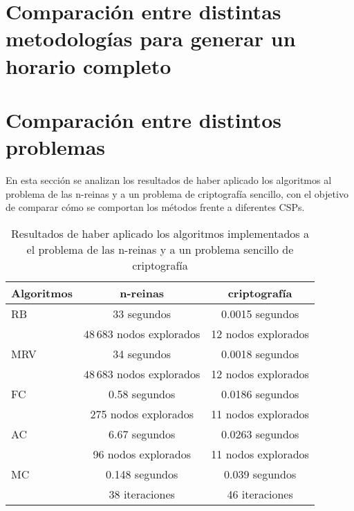 \section{Comparaci\'on entre distintas metodolog\'ias para generar un horario completo}

\section{Comparaci\'on entre distintos problemas}

En esta secci\'on se analizan los resultados de haber aplicado los algoritmos al problema de las n-reinas y a un problema de criptograf\'ia sencillo, con el objetivo de comparar c\'omo se comportan los m\'etodos frente a diferentes CSPs.

\begin{table}[h]
	\caption{Resultados de haber aplicado los algoritmos implementados a el problema de las n-reinas y a un problema sencillo de criptograf\'ia}
	\begin{center}
		\label{2problemas}
		\begin{tabular}{|l|c|c||}
			\hline \hline
			Algoritmos & n-reinas & criptograf\'ia \\ \hline
			RB & 33 segundos & 0.0015 segundos \\
			 & $48\,683$ nodos explorados & 12 nodos explorados \\ \hline
			MRV & 34 segundos &  0.0018 segundos \\
			 & $48\,683$ nodos explorados & 12 nodos explorados \\ \hline
			FC & 0.58 segundos & 0.0186 segundos \\
			 & 275 nodos explorados & 11 nodos explorados \\ \hline
			AC & 6.67 segundos &  0.0263 segundos \\
			 & 96 nodos explorados & 11 nodos explorados \\ \hline
			MC & 0.148 segundos & 0.039 segundos \\
			 & 38 iteraciones & 46 iteraciones \\ \hline
		\end{tabular}
	\end{center}
\end{table}